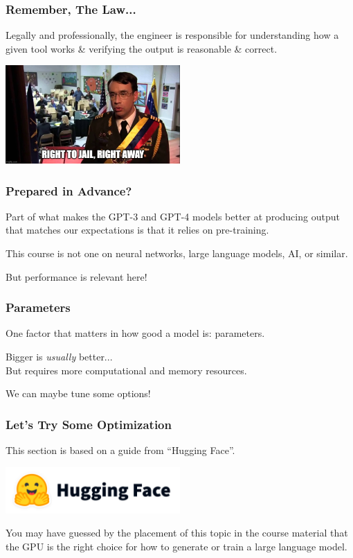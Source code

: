 \begin{frame}
\frametitle{Remember, The Law...}
Legally and professionally, the engineer is responsible for understanding how a given tool works \& verifying the output is reasonable \& correct.

\begin{center}
	\includegraphics[width=0.5\textwidth]{images/jail.jpg}
\end{center}

\end{frame}

\begin{frame}
\frametitle{Prepared in Advance?}
Part of what makes the GPT-3 and GPT-4 models better at producing output that matches our expectations is that it relies on pre-training.

This course is not one on neural networks, large language models, AI, or similar.

But performance is relevant here!

\end{frame}

\begin{frame}
\frametitle{Parameters}

One factor that matters in how good a model is: parameters.

Bigger is \textit{usually} better...\\
\quad But requires more computational and memory resources.

We can maybe tune some options!

\end{frame}

\begin{frame}
\frametitle{Let's Try Some Optimization}

This section is based on a guide from ``Hugging Face''. 

\begin{center}
	\includegraphics[width=0.5\textwidth]{images/hugging-face.png}
\end{center}

You may have guessed by the placement of this topic in the course material that the GPU is the right choice for how to generate or train a large language model. 

\end{frame}

